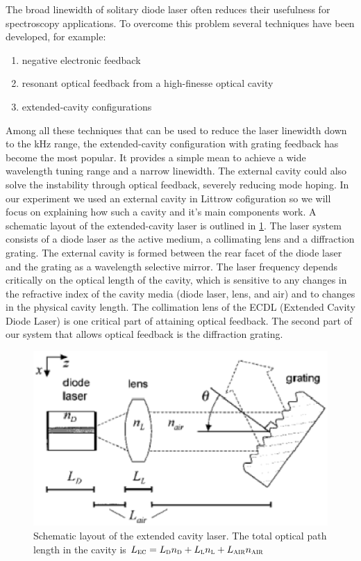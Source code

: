 The broad linewidth of solitary diode laser often reduces their usefulness for spectroscopy applications. To overcome this problem several techniques have been developed, for example:
\begin{enumerate}
\item negative electronic feedback
\item resonant optical feedback from a high-finesse optical cavity
\item extended-cavity configurations
\end{enumerate}
Among all these techniques that can be used to reduce the laser linewidth down to the kHz range, the extended-cavity configuration with grating feedback has become the most popular. It provides a simple mean to achieve a wide wavelength tuning range and a narrow linewidth.
The external cavity could also solve the instability through optical feedback, severely reducing mode hoping.
In our experiment we used an external cavity in Littrow cofiguration so we will focus on explaining how such a cavity and it's main components work.
A schematic layout of the extended-cavity laser is outlined in \cref{grating}. The laser system consists of a diode laser as the active medium, a collimating lens and a diffraction grating. The external cavity is formed between the rear facet of the diode laser and the grating as a wavelength selective mirror. The laser frequency depends critically on the optical length of the cavity, which is sensitive to any changes in the refractive index of the cavity media (diode laser, lens, and air) and to changes in the physical cavity length.
The collimation lens of the ECDL (Extended Cavity Diode Laser) is one critical part of attaining optical feedback. The second part of our system that allows optical feedback is the diffraction  grating. 

\begin{figure}[!hbt]\centering
\includegraphics[width=\linewidth, draft=\foto]{eps/littrow1.eps}
\caption{Schematic layout of the extended cavity laser. The total optical path length in the cavity is $L_{\mbox{\footnotesize{\scshape{ec}}}}=L_{\mbox{\footnotesize{\scshape{d}}}}n_{\mbox{\footnotesize{\scshape{d}}}}+L_{\mbox{\footnotesize{\scshape{l}}}}n_{\mbox{\footnotesize{\scshape{l}}}}+L_{\mbox{\footnotesize{\scshape{air}}}}n_{\mbox{\footnotesize{\scshape{air}}}}$}
\label{grating}
\end{figure}


